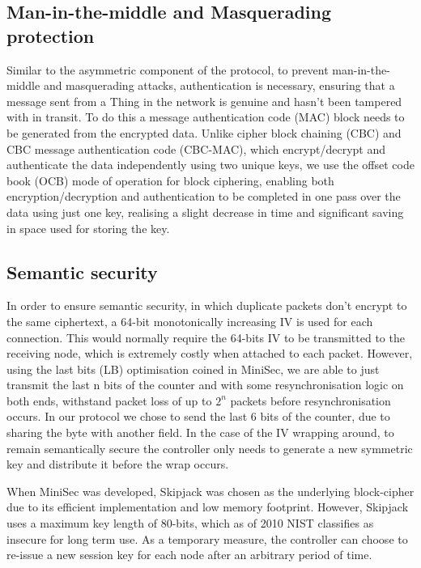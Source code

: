 \documentclass[conference]{./sty/IEEEtran}
\begin{document}
\subsection{Man-in-the-middle and Masquerading protection} %
\label{sub:man_in_the_middle_and_masquerading_protection}
Similar to the asymmetric component of the protocol, to prevent man-in-the-middle and masquerading attacks, authentication is necessary, ensuring that a message sent from a Thing in the network is genuine and hasn't been tampered with in transit. To do this a message authentication code (MAC) block needs to be generated from the encrypted data. Unlike cipher block chaining (CBC) and CBC message authentication code (CBC-MAC), which encrypt/decrypt and authenticate the data independently using two unique keys, we use the offset code book (OCB) mode of operation for block ciphering, enabling both encryption/decryption and authentication to be completed in one pass over the data using just one key, realising a slight decrease in time\cite{ContikiSec} and significant saving in space used for storing the key.

\subsection{Semantic security} %
\label{sub:semantic_security}
In order to ensure semantic security, in which duplicate packets don't encrypt to the same ciphertext, a 64-bit monotonically increasing IV is used for each connection. This would normally require the 64-bits IV to be transmitted to the receiving node, which is extremely costly when attached to each packet. However, using the last bits (LB) optimisation coined in MiniSec, we are able to just transmit the last n bits of the counter and with some resynchronisation logic on both ends, withstand packet loss of up to $2^n$ packets before resynchronisation occurs. In our protocol we chose to send the last 6 bits of the counter, due to sharing the byte with another field. In the case of the IV wrapping around, to remain semantically secure the controller only needs to generate a new symmetric key and distribute it before the wrap occurs.

When MiniSec was developed, Skipjack was chosen as the underlying block-cipher due to its efficient implementation and low memory footprint\cite{Skipjack}. However, Skipjack uses a maximum key length of 80-bits, which as of 2010 NIST classifies as insecure for long term use\cite{NIST}. As a temporary measure, the controller can choose to re-issue a new session key for each node after an arbitrary period of time.  
\end{document}
